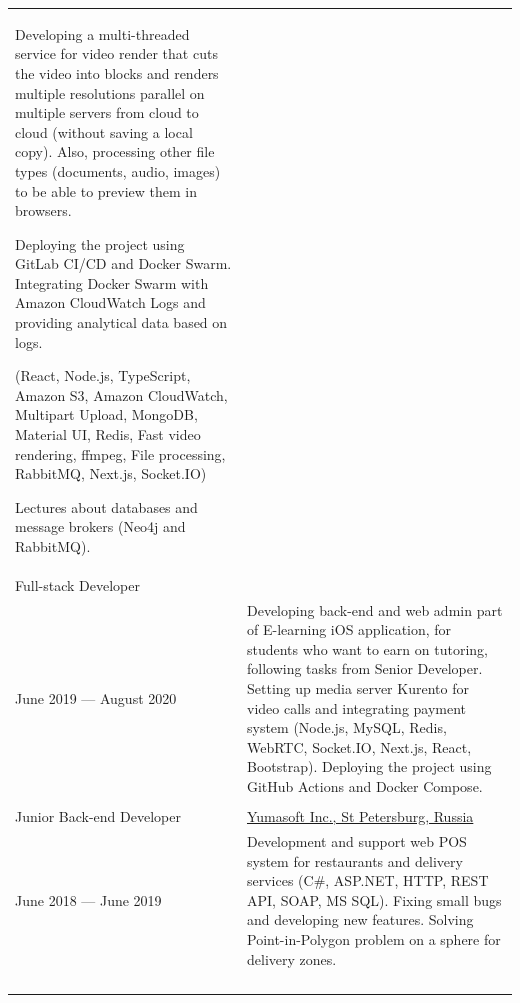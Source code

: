 \documentclass[12pt]{article}
\begin{document}
\begin{tabularx}{500pt}{eX}
        Developing a multi-threaded service for video render that cuts the video into blocks and renders multiple resolutions parallel on multiple servers from cloud to cloud (without saving a local copy).
        Also, processing other file types (documents, audio, images) to be able to preview them in browsers.

        Deploying the project using GitLab CI/CD and Docker Swarm.
        Integrating Docker Swarm with Amazon CloudWatch Logs and providing analytical data based on logs.

        (React, Node.js, TypeScript, Amazon S3, Amazon CloudWatch, Multipart Upload, MongoDB, Material UI, Redis, Fast video rendering, ffmpeg, File processing, RabbitMQ, Next.js, Socket.IO)

        Lectures about databases and message brokers (Neo4j and RabbitMQ).

        \\

        Full-stack Developer & \\

        June 2019 --- August 2020

        & Developing back-end and web admin part of E-learning iOS application, for students who want to earn on tutoring, following tasks from Senior Developer.
        Setting up media server Kurento for video calls and integrating payment system (Node.js, MySQL, Redis, WebRTC, Socket.IO, Next.js, React, Bootstrap).
        Deploying the project using GitHub Actions and Docker Compose.\\

        &\\

        Junior Back-end Developer & \underline{Yumasoft Inc., St Petersburg, Russia} \\

        June 2018 --- June 2019

        & Development and support web POS system for restaurants and delivery services (C\#, ASP.NET, HTTP, REST API, SOAP, MS SQL).
        Fixing small bugs and developing new features.
        Solving Point-in-Polygon problem on a sphere for delivery zones.

        \\

        &\\
        &\\
        &\\
        &\\


\end{tabularx}
\end{document}
